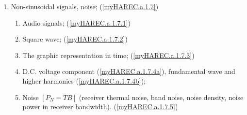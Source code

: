 \begin{enumerate}
\begin{enumerate}
\item Non-sinusoidal signals, noise; (\ref{myHAREC.a.1.7})\label{HAREC.a.1.7}
\begin{enumerate}
\item Audio signals; (\ref{myHAREC.a.1.7.1})\label{HAREC.a.1.7.1}
\item Square wave; (\ref{myHAREC.a.1.7.2})\label{HAREC.a.1.7.2}
\item The graphic representation in time;
  (\ref{myHAREC.a.1.7.3})\label{HAREC.a.1.7.3}
\item D.C. voltage component (\ref{myHAREC.a.1.7.4a})\label{HAREC.a.1.7.4a},
  fundamental wave and higher harmonics
  (\ref{myHAREC.a.1.7.4b})\label{HAREC.a.1.7.4b};
\item Noise \(\left[P_N=TB\right]\) (receiver thermal noise, band noise,
  noise density, noise power in receiver bandwidth).
  (\ref{myHAREC.a.1.7.5})\label{HAREC.a.1.7.5}
\end{enumerate}


\end{enumerate}
\end{enumerate}
